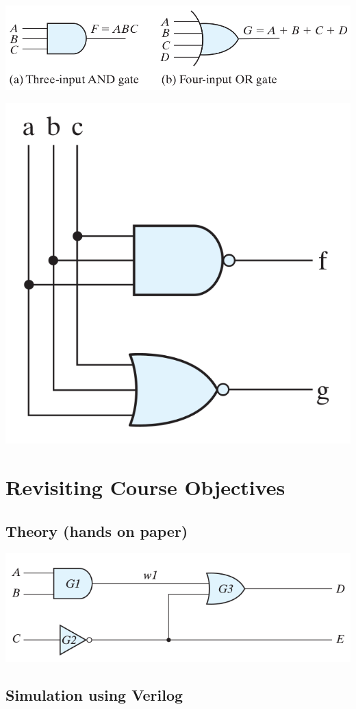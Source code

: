 \clearpage

\hfil\includegraphics[width=\textwidth]{../Graphics/Ch01Art31b.png}\hfil

\clearpage

\hfil\includegraphics[width=.7\textwidth]{../Graphics/Ch01Art34a.png}\hfil



\clearpage

\section*{Revisiting Course Objectives}\label{sec:revis-course-object}

\subsection*{Theory (hands on paper)}\label{sec:theory-hands-paper}

\hfil\includegraphics[width=.5\textwidth]{../Graphics/Ch03Art42.png}\hfil


\subsection*{Simulation using Verilog}\label{sec:simul-using-veril}

